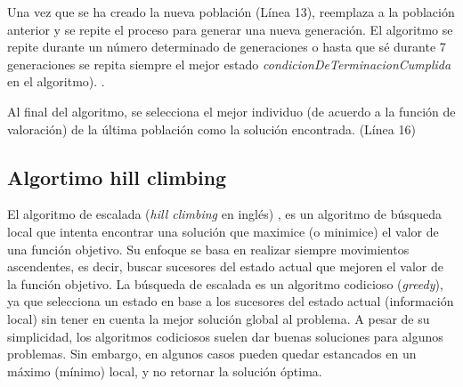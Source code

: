 Una vez que se ha creado la nueva población (Línea 13), reemplaza a la población anterior y se repite el proceso para generar una nueva generación. El algoritmo se repite durante un número determinado de generaciones o hasta que sé durante 7 generaciones se repita siempre el mejor estado \emph{condicionDeTerminacionCumplida} en el algoritmo).
.

Al final del algoritmo, se selecciona el mejor individuo (de acuerdo a la función de valoración) de la última población como la solución encontrada. (Línea 16)


\subsection{Algortimo hill climbing}
\label{alg:approachHC}

El algoritmo de escalada (\emph{hill climbing} en inglés) \cite{Russell:2009, Cormen2009, kleinberg2006}, es un algoritmo de búsqueda local que intenta encontrar una solución que maximice (o minimice) el valor de una función objetivo. Su enfoque se basa en realizar siempre movimientos ascendentes, es decir, buscar sucesores del estado actual que mejoren el valor de la función objetivo. La búsqueda de escalada es un algoritmo codicioso (\emph{greedy}), ya que selecciona un estado en base a los sucesores del estado actual (información local) sin tener en cuenta la mejor solución global al problema. A pesar de su simplicidad, los algoritmos codiciosos suelen dar buenas soluciones para algunos problemas. Sin embargo, en algunos casos pueden quedar estancados en un máximo (mínimo) local, y no retornar la solución óptima.

